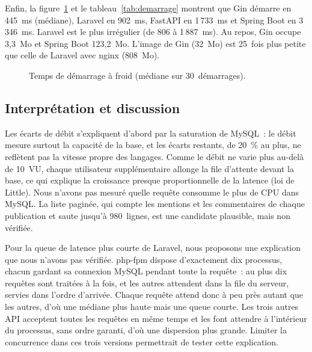 \documentclass[conference,a4paper]{IEEEtran}
\begin{document}
Enfin, la figure~\ref{fig:demarrage} et le tableau~\ref{tab:demarrage}
montrent que Gin démarre en 445~ms (médiane), Laravel en 902~ms,
FastAPI en 1\,733~ms et Spring Boot en 3\,346~ms. Laravel est le plus
irrégulier (de 806 à 1\,887~ms). Au repos, Gin occupe 3,3~Mo et Spring
Boot 123,2~Mo. L'image de Gin (32~Mo) est 25~fois plus petite que celle
de Laravel avec nginx (808~Mo).

\begin{figure}[htbp]
\centering

\caption{Temps de démarrage à froid (médiane sur 30~démarrages).}
\label{fig:demarrage}
\end{figure}

\begin{table}[htbp]
\caption{Démarrage à froid, RAM au repos et taille des images}
\label{tab:demarrage}
\centering

\end{table}

\subsection{Interprétation et discussion}
Les écarts de débit s'expliquent d'abord par la saturation de MySQL~:
le débit mesure surtout la capacité de la base, et les écarts restants,
de 20~\% au plus, ne reflètent pas la vitesse propre des langages. Comme
le débit ne varie plus au-delà de 10~VU, chaque utilisateur
supplémentaire allonge la file d'attente devant la base, ce qui
explique la croissance presque proportionnelle de la latence (loi de
Little). Nous n'avons pas mesuré quelle requête consomme le plus de
CPU dans MySQL. La liste paginée, qui compte les mentions et les
commentaires de chaque publication et saute jusqu'à 980~lignes, est
une candidate plausible, mais non vérifiée.

Pour la queue de latence plus courte de Laravel, nous proposons une
explication que nous n'avons pas vérifiée. php-fpm dispose
d'exactement dix processus, chacun gardant sa connexion MySQL pendant
toute la requête~: au plus dix requêtes sont traitées à la fois, et les
autres attendent dans la file du serveur, servies dans l'ordre
d'arrivée. Chaque requête attend donc à peu près autant que les
autres, d'où une médiane plus haute mais une queue courte. Les trois
autres API acceptent toutes les requêtes en même temps et les font
attendre à l'intérieur du processus, sans ordre garanti, d'où une
dispersion plus grande. Limiter la concurrence dans ces trois versions
permettrait de tester cette explication.
\end{document}
